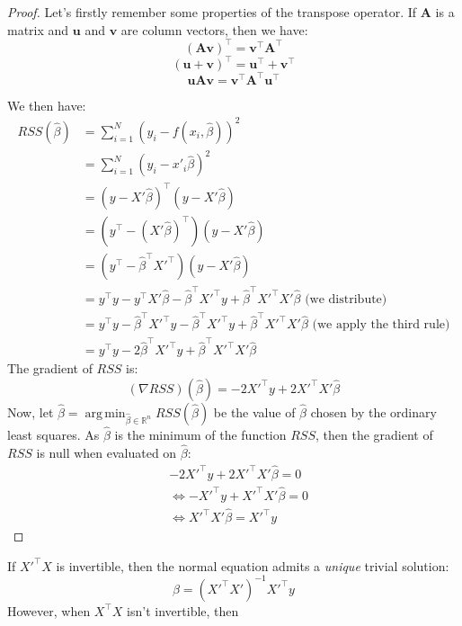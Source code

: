 \documentclass{article}
\theoremstyle{definition}
\theoremstyle{remark}
\theoremstyle{example}
\DeclareMathOperator*{\argmin}{arg\,min}
\newcommand{\AAA}{\mathbf{A}}
\newcommand{\uu}{\mathbf{u}}
\newcommand{\vv}{\mathbf{v}}
\newcommand{\betat}{\hat{\beta}}
\begin{document}
\begin{proof} %
		Let's firstly remember some properties of the transpose operator. If $\AAA$ is a matrix and $\uu$ and $\vv$ are column vectors, then we have:
				$$(\AAA\vv)^\top = \vv^\top \AAA^\top$$
				$$(\uu + \vv)^\top = \uu^\top + \vv^\top$$
				$$\uu \AAA \vv = \vv^\top \AAA^\top \uu^\top$$

		We then have:
		\begin{align*}
				RSS(\betat) &= \sum_{i=1}^N (y_i - f(x_i, \betat))^2\\
							&= \sum_{i=1}^N (y_i - x'_i \betat)^2\\
							&= (y - X' \betat)^\top (y - X' \betat)\\
							&= (y^\top - (X' \betat)^\top)(y - X' \betat)\\
							&= (y^\top - \betat^\top X'^\top)(y - X' \betat)\\
							&= y^\top y - y^\top X' \betat - \betat^\top X'^\top y + \betat^\top X'^\top X' \betat \text{ (we distribute)}\\
							&= y^\top y - \betat^\top X'^\top y - \betat^\top X'^\top y + \betat^\top X'^\top X' \betat \text{ (we apply the third rule)}\\
							&= y^\top y - 2 \betat^\top X'^\top y + \betat^\top X'^\top X' \betat
		\end{align*}
		The gradient of $RSS$ is: %
				$$(\nabla RSS)(\betat) = -2X'^\top y + 2X'^\top X' \betat$$
		Now, let $\betat = \argmin_{\betat \in \mathbb{R}^n} RSS(\betat)$ be the value of $\betat$ chosen by the ordinary least squares. As $\betat$ is the minimum of the function $RSS$, then the gradient of $RSS$ is null when evaluated on $\betat$:
		\begin{align*}
				&-2X'^\top y + 2X'^\top X' \betat = 0\\
				&\iff -X'^\top y + X'^\top X' \betat = 0\\
				&\iff X'^\top X' \betat = X'^\top y
		\end{align*}
\end{proof}


If $X'^\top X$ is invertible, then the normal equation admits a \textit{unique} trivial solution:
		$$\betat = (X'^\top X')^{-1}X'^\top y$$
However, when $X^\top X$ isn't invertible, then %
\end{document}
